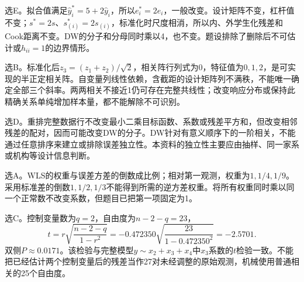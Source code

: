选E。拟合值满足$\widehat y_i^*=5+2\widehat y_i$，所以$e_i^*=2e_i$，一般改变。设计矩阵不变，杠杆值不变；$s^*=2s$、$s_{(i)}^*=2s_{(i)}$，标准化时尺度相消，所以内、外学生化残差和Cook距离不变。DW的分子和分母同时乘以4，也不变。题设排除了删除后不可估计或$h_{ii}=1$的边界情形。
\par\nobreak\smallskip{}

选B。标准化后$z_3=(z_1+z_2)/\sqrt2$，相关阵行列式为0，特征值为$0,1,2$，是可实现的半正定相关阵。自变量列线性依赖，含截距的设计矩阵列不满秩，不能唯一确定全部三个斜率。两两相关不接近1仍可存在完整共线性；改变响应分布或保持此精确关系单纯增加样本量，都不能解除不可识别。
\par\nobreak\smallskip{}

选D。重排完整数据行不改变最小二乘目标函数、系数或残差平方和，但改变相邻残差的配对，因而可能改变DW的分子。DW针对有意义顺序下的一阶相关，不能通过任意排序来建立或排除误差独立性。本资料的独立性主要应由抽样、同一家系或机构等设计信息判断。
\par\nobreak\smallskip{}

选A。WLS的权重与误差方差的倒数成比例；相对第一观测，权重为$1,1/4,1/9$。采用标准差的倒数$1,1/2,1/3$不能得到所需的逆方差权重。将所有权重同时乘以同一个正常数不改变系数，但题目已把第一项固定为1。
\par\nobreak\smallskip{}

选C。控制变量数为$q=2$，自由度为$n-2-q=23$，\[t=r\sqrt{\frac{n-2-q}{1-r^2}}=-0.472350\sqrt{\frac{23}{1-0.472350^2}}=-2.5701.\]双侧$P\approx0.0171$。该检验与完整模型$y\sim x_2+x_3+x_4$中$x_3$系数的$t$检验一致。不能把已经估计两个控制变量后的残差当作27对未经调整的原始观测，机械使用普通相关的25个自由度。
\par\nobreak\smallskip{}

